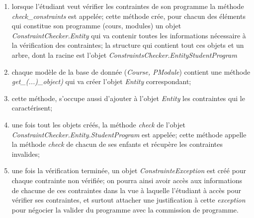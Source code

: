 \begin{enumerate}
\item lorsque l'étudiant veut vérifier les contraintes de son programme la méthode \textit{check\_constraints} est appelée; cette méthode crée, pour chacun des éléments qui constitue son programme (cours, modules) un objet \textit{ConstraintChecker.Entity}  qui va contenir toutes les informations nécessaire à la vérification des contraintes; la structure qui contient tout ces objets et un arbre, dont la racine est l'objet \textit{ConstraintsChecker.Entity\:\:StudentProgram}
\item chaque modèle de la base de donnée (\textit{Course, PModule}) contient une méthode \textit{get\_(...)\_object)} qui va créer l'objet \textit{Entity} correspondant;
\item cette méthode, s'occupe aussi d'ajouter à l'objet \textit{Entity} les contraintes qui le caractérisent;
\item une fois tout les objets créés, la méthode \textit{check} de l'objet\\ 
\textit{ConstraintChecker.Entity.StudentProgram} est appelée; cette méthode appelle la méthode \textit{check} de chacun de ses enfants et récupère les contraintes invalides;
\item une fois la vérification terminée, un objet \textit{ConstrainteException} est créé pour chaque contrainte non vérifiée; on pourra ainsi avoir accès aux informations de chacune de ces contraintes dans la vue à laquelle l'étudiant à accès pour vérifier ses contraintes, et surtout attacher une justification à cette \textit{exception} pour négocier la valider du programme avec la commission de programme.
\end{enumerate}




